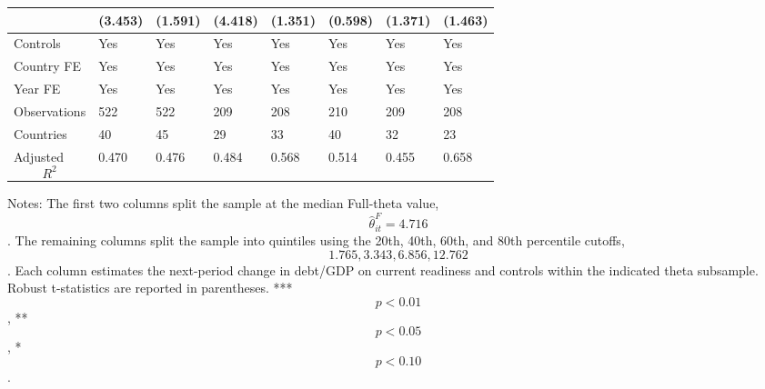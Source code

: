 \begin{table}[H]
\begin{threeparttable}
\begin{tabularx}{\textwidth}{lYYYYYYY}
  & (3.453) & (1.591) & (4.418) & (1.351) & (0.598) & (1.371) & (1.463) \\
\midrule
Controls & Yes & Yes & Yes & Yes & Yes & Yes & Yes \\
Country FE & Yes & Yes & Yes & Yes & Yes & Yes & Yes \\
Year FE & Yes & Yes & Yes & Yes & Yes & Yes & Yes \\
Observations & 522 & 522 & 209 & 208 & 210 & 209 & 208 \\
Countries & 40 & 45 & 29 & 33 & 40 & 32 & 23 \\
Adjusted $$R^2$$ & 0.470 & 0.476 & 0.484 & 0.568 & 0.514 & 0.455 & 0.658 \\
\bottomrule
\end{tabularx}
\begin{tablenotes}[flushleft]\footnotesize
\item Notes: The first two columns split the sample at the median Full-theta value, $$\widehat{\theta}^{F}_{it}=4.716$$. The remaining columns split the sample into quintiles using the 20th, 40th, 60th, and 80th percentile cutoffs, $$1.765, 3.343, 6.856, 12.762$$. Each column estimates the next-period change in debt/GDP on current readiness and controls within the indicated theta subsample. Robust t-statistics are reported in parentheses. *** $$p<0.01$$, ** $$p<0.05$$, * $$p<0.10$$.
\end{tablenotes}
\end{threeparttable}
\end{table}

